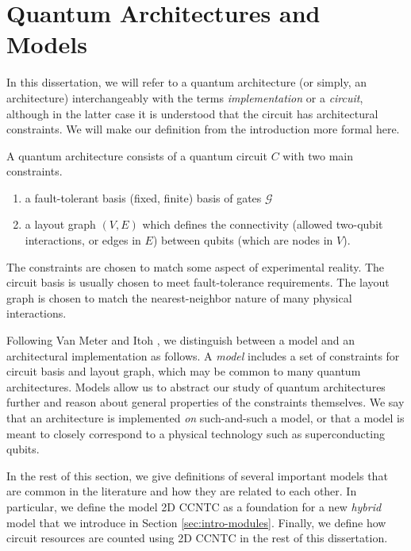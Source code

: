 \section{Quantum Architectures and Models}
\label{sec:intro-arch}

In this dissertation, we will refer to a quantum architecture (or simply,
an architecture) interchangeably with the terms \emph{implementation} 
or a \emph{circuit}, although in the latter case it is understood that the
circuit has architectural constraints. We will make our definition from
the introduction more formal here.

\begin{definition}
A quantum architecture consists of a quantum circuit $C$ with
two main constraints.

\begin{enumerate}
\item a fault-tolerant basis (fixed, finite) basis of
gates $\mathcal{G}$
\item a layout graph $(V,E)$ which defines the connectivity (allowed two-qubit
interactions, or edges in $E$) between qubits (which are nodes in $V$).
\end{enumerate}
\end{definition}

The constraints are chosen to match some aspect of experimental reality.
The circuit basis is usually chosen to meet fault-tolerance requirements.
The layout graph is chosen to match the nearest-neighbor nature of
many physical interactions.

Following Van Meter and Itoh \cite{VanMeter2005},
we distinguish between a model and an architectural implementation as follows.
A \emph{model} includes a set of constraints for circuit basis and layout
graph, which may be common to many quantum architectures. Models allow us
to abstract our study of quantum architectures further and reason about
general properties of the constraints themselves.
We say that an architecture is implemented \emph{on} such-and-such a model,
or that a model is meant to closely correspond to a physical technology such as
superconducting qubits.

In the rest of this section, we give definitions of
several important models that are common in the literature and how they are
related to each other.
In particular, we define the
model \textsf{2D CCNTC} as a foundation for a new \emph{hybrid}
model that we
introduce in Section \ref{sec:intro-modules}. Finally, we define how
circuit resources are counted using \textsf{2D CCNTC} in the rest of this
dissertation.

